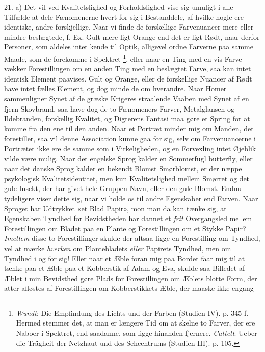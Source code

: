 \documentclass[12pt,a4paper,openany]{book}
\newcommand{\opage}[1]{\marginnote{\footnotesize\textit{[#1]}}}
\begin{document}
21. a) Det vil ved Kvalitetslighed og Forholdslighed vise sig umuligt i alle
Tilfælde at dele Fænomenerne hvert for sig i Bestanddele, af hvilke nogle ere
identiske, andre forskjellige. Naar vi finde de forskellige Farvenuancer mere
eller mindre beslægtede, f. Ex. Gult mere ligt Orange end det er ligt Rødt,
naar derfor Personer, som aldeles intet kende til Optik, alligevel ordne
Farverne paa samme Maade, som de forekomme i Spektret%
\footnote[1]{\emph{Wundt}: Die Empfindung des Lichts und der Farben (Studien
IV). p. 345 f. --- Hermed stemmer det, at man er længere Tid om at skelne to
Farver, der ere Naboer i Spektret, end saadanne, som ligge hinanden fjernere.
\emph{Cattell}: Ueber die Trägheit der Netzhaut und des Sehcentrums (Studien
III). p. 105.}, eller
\setcounter{footnote}{0}%
\opage{45}naar en Ting med en vis Farve vækker Forestillingen om en anden Ting
med en beslægtet Farve, saa kan intet identisk Element paavises. Gult og
Orange, eller de forskellige Nuancer af Rødt have intet fælles Element, og dog
minde de om hverandre. Naar Homer sammenligner Synet af de græske Krigeres
straalende Vaaben med Synet af en fjern Skovbrand, saa have dog de to
Fænomeners Farver, Metalglansen og Ildebranden, forskellig Kvalitet, og
Digterens Fantasi maa gøre et Spring for at komme fra den ene til den anden.
Naar et Portræt minder mig om Manden, det forestiller, saa vil denne
Association kunne gaa for sig, selv om Farvenuancerne i Portrætet ikke ere de
samme som i Virkeligheden, og en Forvexling intet Øjeblik vilde være mulig.
Naar det engelske Sprog kalder en Sommerfugl butterfly, eller naar det danske
Sprog kalder en bekendt Blomst Smørblomst, er der næppe psykologisk
Kvalitetsidentitet, men kun Kvalitetslighed mellem Smørret og det gule Insekt,
der har givet hele Gruppen Navn, eller den gule Blomst. Endnu tydeligere viser
dette sig, naar vi holde os til andre Egenskaber end Farven. Naar Sproget har
Udtrykket «et Blad Papir», mon man da kan tænke sig, at Egenskaben Tyndhed for
Bevidstheden har dannet et \emph{frit} Overgangsled mellem Forestillingen om
Bladet paa en Plante og Forestillingen om et Stykke Papir? \emph{Imellem} disse
to Forestillinger skulde der altsaa ligge en Forestilling om Tyndhed, vel at
mærke \emph{hverken} om Plantebladets \emph{eller} Papirets Tyndhed, men om
Tyndhed i og for sig! Eller naar et Æble foran mig paa Bordet faar mig til at
tænke paa et Æble paa et Kobberstik af Adam og Eva, skulde saa Billedet af
Æblet i min Bevidsthed gøre Plads for Forestillingen om Æblets blotte Form, der
atter afløstes af Forestillingen om Kobberstikkets Æble, der maaske ikke engang
\end{document}
